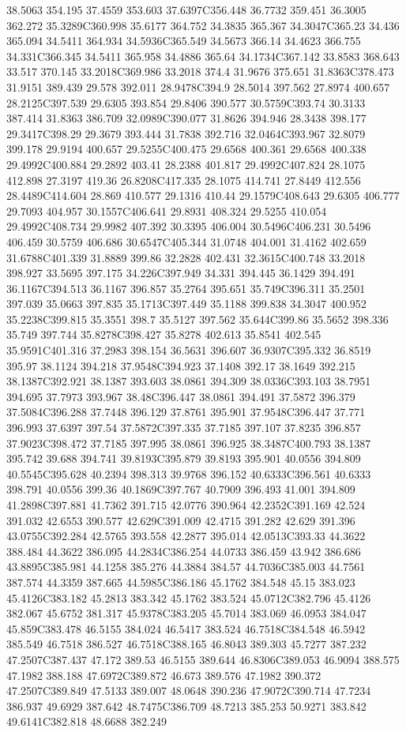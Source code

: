 38.5063 354.195 37.4559 353.603 37.6397C356.448 36.7732 359.451 36.3005 362.272 35.3289C360.998 35.6177 364.752 34.3835 365.367 34.3047C365.23 34.436 365.094 34.5411 364.934 34.5936C365.549 34.5673 366.14 34.4623 366.755 34.331C366.345 34.5411 365.958 34.4886 365.64 34.1734C367.142 33.8583 368.643 33.517 370.145 33.2018C369.986 33.2018 374.4 31.9676 375.651 31.8363C378.473 31.9151 389.439 29.578 392.011 28.9478C394.9 28.5014 397.562 27.8974 400.657 28.2125C397.539 29.6305 393.854 29.8406 390.577 30.5759C393.74 30.3133 387.414 31.8363 386.709 32.0989C390.077 31.8626 394.946 28.3438 398.177 29.3417C398.29 29.3679 393.444 31.7838 392.716 32.0464C393.967 32.8079 399.178 29.9194 400.657 29.5255C400.475 29.6568 400.361 29.6568 400.338 29.4992C400.884 29.2892 403.41 28.2388 401.817 29.4992C407.824 28.1075 412.898 27.3197 419.36 26.8208C417.335 28.1075 414.741 27.8449 412.556 28.4489C414.604 28.869 410.577 29.1316 410.44 29.1579C408.643 29.6305 406.777 29.7093 404.957 30.1557C406.641 29.8931 408.324 29.5255 410.054 29.4992C408.734 29.9982 407.392 30.3395 406.004 30.5496C406.231 30.5496 406.459 30.5759 406.686 30.6547C405.344 31.0748 404.001 31.4162 402.659 31.6788C401.339 31.8889 399.86 32.2828 402.431 32.3615C400.748 33.2018 398.927 33.5695 397.175 34.226C397.949 34.331 394.445 36.1429 394.491 36.1167C394.513 36.1167 396.857 35.2764 395.651 35.749C396.311 35.2501 397.039 35.0663 397.835 35.1713C397.449 35.1188 399.838 34.3047 400.952 35.2238C399.815 35.3551 398.7 35.5127 397.562 35.644C399.86 35.5652 398.336 35.749 397.744 35.8278C398.427 35.8278 402.613 35.8541 402.545 35.9591C401.316 37.2983 398.154 36.5631 396.607 36.9307C395.332 36.8519 395.97 38.1124 394.218 37.9548C394.923 37.1408 392.17 38.1649 392.215 38.1387C392.921 38.1387 393.603 38.0861 394.309 38.0336C393.103 38.7951 394.695 37.7973 393.967 38.48C396.447 38.0861 394.491 37.5872 396.379 37.5084C396.288 37.7448 396.129 37.8761 395.901 37.9548C396.447 37.771 396.993 37.6397 397.54 37.5872C397.335 37.7185 397.107 37.8235 396.857 37.9023C398.472 37.7185 397.995 38.0861 396.925 38.3487C400.793 38.1387 395.742 39.688 394.741 39.8193C395.879 39.8193 395.901 40.0556 394.809 40.5545C395.628 40.2394 398.313 39.9768 396.152 40.6333C396.561 40.6333 398.791 40.0556 399.36 40.1869C397.767 40.7909 396.493 41.001 394.809 41.2898C397.881 41.7362 391.715 42.0776 390.964 42.2352C391.169 42.524 391.032 42.6553 390.577 42.629C391.009 42.4715 391.282 42.629 391.396 43.0755C392.284 42.5765 393.558 42.2877 395.014 42.0513C393.33 44.3622 388.484 44.3622 386.095 44.2834C386.254 44.0733 386.459 43.942 386.686 43.8895C385.981 44.1258 385.276 44.3884 384.57 44.7036C385.003 44.7561 387.574 44.3359 387.665 44.5985C386.186 45.1762 384.548 45.15 383.023 45.4126C383.182 45.2813 383.342 45.1762 383.524 45.0712C382.796 45.4126 382.067 45.6752 381.317 45.9378C383.205 45.7014 383.069 46.0953 384.047 45.859C383.478 46.5155 384.024 46.5417 383.524 46.7518C384.548 46.5942 385.549 46.7518 386.527 46.7518C388.165 46.8043 389.303 45.7277 387.232 47.2507C387.437 47.172 389.53 46.5155 389.644 46.8306C389.053 46.9094 388.575 47.1982 388.188 47.6972C389.872 46.673 389.576 47.1982 390.372 47.2507C389.849 47.5133 389.007 48.0648 390.236 47.9072C390.714 47.7234 386.937 49.6929 387.642 48.7475C386.709 48.7213 385.253 50.9271 383.842 49.6141C382.818 48.6688 382.249 